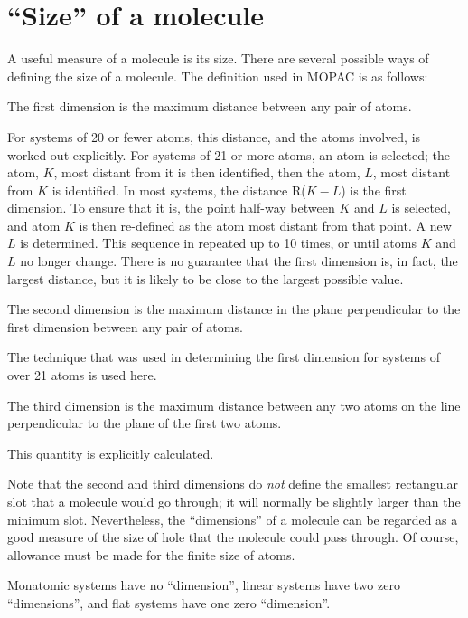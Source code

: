 \section{``Size'' of a molecule}
A useful measure of a molecule is its size.  There are several possible ways of
defining the size of a molecule.  The definition used in MOPAC is as follows:

The first dimension is the maximum distance between any pair of atoms.  

For systems  of 20 or fewer atoms, this distance, and the atoms involved, is
worked out explicitly.  For systems of 21 or more atoms, an atom is selected;
the atom, $K$,  most distant from it is then identified, then the atom, $L$,
most distant  from $K$ is identified.  In most systems, the distance R($K-L$)
is the first dimension.  To ensure that it is, the point half-way between $K$
and $L$ is  selected, and atom $K$ is then re-defined as the atom most distant
from  that point.  A new $L$ is determined.  This sequence in repeated up to 10
times, or until atoms $K$ and $L$ no longer change. There is no guarantee that
the first dimension is, in fact, the largest distance, but it is likely to be
close to the largest possible value.

The second dimension is the maximum distance in the plane perpendicular to the
first dimension between any pair of atoms. 

The technique that was used in determining the first dimension for systems of
over 21 atoms is used here.

The third dimension is the maximum distance between any two atoms on the line
perpendicular to the plane of the first two atoms.

This quantity is explicitly calculated.

Note that the second and third dimensions do {\em not} define the smallest 
rectangular slot that a molecule would go through; it will normally be slightly
larger than the minimum slot. Nevertheless, the ``dimensions'' of a molecule
can be regarded as a good measure of the size of hole that the molecule could
pass through.  Of course, allowance must be made for the finite size of atoms.

Monatomic systems have no ``dimension'', linear systems have two zero
``dimensions'', and flat systems have one zero ``dimension''.



